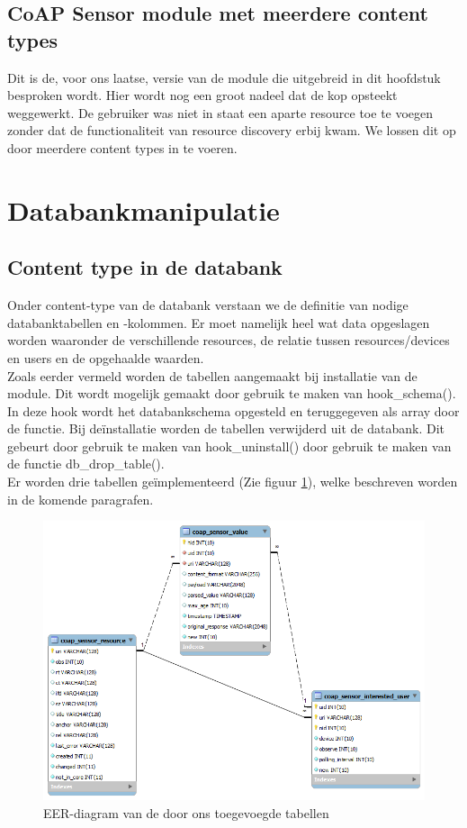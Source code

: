 \subsection{CoAP Sensor module met meerdere content types}
Dit is de, voor ons laatse, versie van de module die uitgebreid in dit hoofdstuk besproken wordt. Hier wordt nog een groot nadeel dat de kop opsteekt weggewerkt. De gebruiker was niet in staat een aparte resource toe te voegen zonder dat de functionaliteit van resource discovery erbij kwam. We lossen dit op door meerdere content types in te voeren.

\section{Databankmanipulatie}

\subsection{Content type in de databank}\label{databankSchema}
Onder content-type van de databank verstaan we de definitie van nodige databanktabellen en -kolommen. Er moet namelijk heel wat data opgeslagen worden waaronder de verschillende resources, de relatie tussen resources/devices en users en de opgehaalde waarden.\\

Zoals eerder vermeld worden de tabellen aangemaakt bij installatie van de module. Dit wordt mogelijk gemaakt door gebruik te maken van hook\_schema(). In deze hook wordt het databankschema opgesteld en teruggegeven als array door de functie. Bij de\"{i}nstallatie worden de tabellen verwijderd uit de databank. Dit gebeurt door gebruik te maken van hook\_uninstall() door gebruik te maken van de functie db\_drop\_table().\\

\noindent
Er worden drie tabellen ge\"{i}mplementeerd (Zie figuur \ref{fig:databankModel}), welke beschreven worden in de komende paragrafen.
\begin{figure}[h!]
\centering
\includegraphics[width=1\textwidth]{fig/databankModel}
\caption{EER-diagram van de door ons toegevoegde tabellen}
\label{fig:databankModel}
\end{figure}


